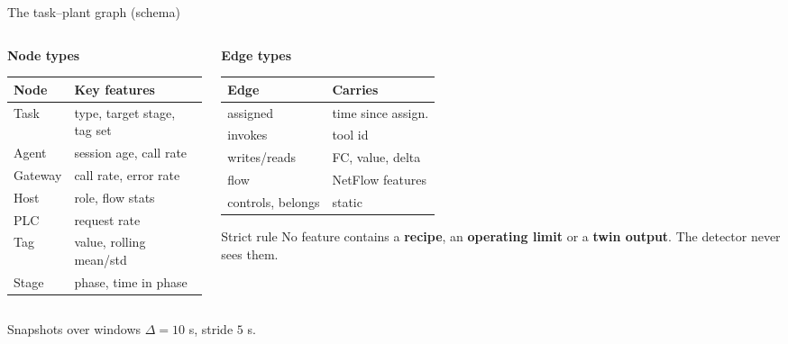 \documentclass[aspectratio=169]{beamer}
\newcommand{\warn}[1]{\textcolor{accent2}{\textbf{#1}}}
\begin{document}
\begin{frame}{The task--plant graph (schema)}
\footnotesize
\begin{columns}[T]
\begin{column}{0.5\textwidth}
\textbf{Node types}
\begin{tabular}{@{}ll@{}}
\toprule
Node & Key features \\
\midrule
Task  & type, target stage, tag set \\
Agent & session age, call rate \\
Gateway & call rate, error rate \\
Host & role, flow stats \\
PLC & request rate \\
Tag & value, rolling mean/std \\
Stage & phase, time in phase \\
\bottomrule
\end{tabular}
\end{column}
\begin{column}{0.5\textwidth}
\textbf{Edge types}
\begin{tabular}{@{}ll@{}}
\toprule
Edge & Carries \\
\midrule
assigned & time since assign. \\
invokes & tool id \\
writes/reads & FC, value, delta \\
flow & NetFlow features \\
controls, belongs & static \\
\bottomrule
\end{tabular}
\vspace{0.6em}
\begin{block}{Strict rule}
No feature contains a \warn{recipe}, an \warn{operating limit} or a
\warn{twin output}. The detector never sees them.
\end{block}
\end{column}
\end{columns}
\vspace{0.3em}
\centering\textcolor{muted}{Snapshots over windows $\Delta=10$ s, stride $5$ s.}
\end{frame}
\end{document}
